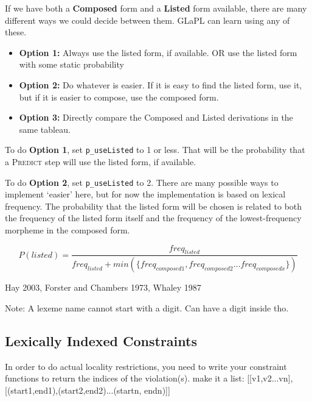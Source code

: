 \documentclass[12]{article}
\begin{document}
		\hspace{2ex}
		
		
		If we have both a {\bf Composed} form and a {\bf Listed} form available, there are many different ways we could decide between them.  GLaPL can learn using any of these.
		
		\begin{itemize}
			\item[] {\bf Option 1:} Always use the listed form, if available.  OR use the listed form with some static probability
			\item[] {\bf Option 2:} Do whatever is easier.  If it is easy to find the listed form, use it, but if it is easier to compose, use the composed form.
			\item[] {\bf Option 3:} Directly compare the Composed and Listed derivations in the same tableau.
		\end{itemize}

		To do {\bf Option 1}, set \texttt{p\_useListed} to 1 or less.  That will be the probability that a \textsc{Predict} step will use the listed form, if available.
		
		To do {\bf Option 2}, set \texttt{p\_useListed} to 2. There are many possible ways to implement `easier' here, but for now the implementation is based on lexical frequency.  The probability that the listed form will be chosen is related to both the frequency of the listed form itself and the frequency of the lowest-frequency morpheme in the composed form.  
		
		\[
		P(listed) = \frac{freq_{listed}}{freq_{listed} + min(\{freq_{composed1}, freq_{composed2}\ldots freq_{composedx}\})}
		\]
		
		Hay 2003, Forster and Chambers 1973, Whaley 1987 %

		Note: A lexeme name cannot start with a digit.  Can have a digit inside tho.

	\subsection{Lexically Indexed Constraints}
		
		In order to do actual locality restrictions, you need to write your constraint functions to return the indices of the violation(s).  make it a list: [[v1,v2...vn],[(start1,end1),(start2,end2)...(startn, endn)]]
		
\end{document}
